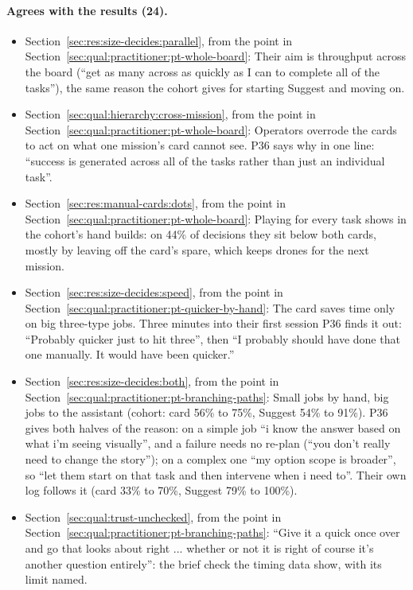 \paragraph*{Agrees with the results (24).}
\begin{itemize}[leftmargin=1.2em,itemsep=1pt]\small
\item Section~\ref{sec:res:size-decides:parallel}, from the point in Section~\ref{sec:qual:practitioner:pt-whole-board}: Their aim is throughput across the board (``get as many across as quickly as I can to complete all of the tasks''), the same reason the cohort gives for starting Suggest and moving on.
\item Section~\ref{sec:qual:hierarchy:cross-mission}, from the point in Section~\ref{sec:qual:practitioner:pt-whole-board}: Operators overrode the cards to act on what one mission's card cannot see. P36 says why in one line: ``success is generated across all of the tasks rather than just an individual task''.
\item Section~\ref{sec:res:manual-cards:dots}, from the point in Section~\ref{sec:qual:practitioner:pt-whole-board}: Playing for every task shows in the cohort's hand builds: on 44\% of decisions they sit below both cards, mostly by leaving off the card's spare, which keeps drones for the next mission.
\item Section~\ref{sec:res:size-decides:speed}, from the point in Section~\ref{sec:qual:practitioner:pt-quicker-by-hand}: The card saves time only on big three-type jobs. Three minutes into their first session P36 finds it out: ``Probably quicker just to hit three'', then ``I probably should have done that one manually. It would have been quicker.''
\item Section~\ref{sec:res:size-decides:both}, from the point in Section~\ref{sec:qual:practitioner:pt-branching-paths}: Small jobs by hand, big jobs to the assistant (cohort: card 56\% to 75\%, Suggest 54\% to 91\%). P36 gives both halves of the reason: on a simple job ``i know the answer based on what i'm seeing visually'', and a failure needs no re-plan (``you don't really need to change the story''); on a complex one ``my option scope is broader'', so ``let them start on that task and then intervene when i need to''. Their own log follows it (card 33\% to 70\%, Suggest 79\% to 100\%).
\item Section~\ref{sec:qual:trust-unchecked}, from the point in Section~\ref{sec:qual:practitioner:pt-branching-paths}: ``Give it a quick once over and go that looks about right ... whether or not it is right of course it's another question entirely'': the brief check the timing data show, with its limit named.

\end{itemize}
